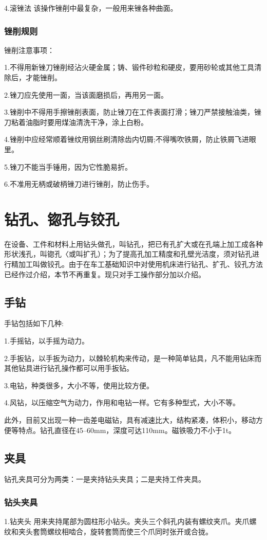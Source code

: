 \documentclass{ctexbook}
\begin{document}
4.滚锉法 该操作锉削中最复杂，一般用来锉各种曲面。
\subsubsection{锉削规则}
锉削注意事项：

1.不得用新锉刀锉削经沾火硬金属；铸、锻件砂粒和硬皮，要用砂轮或其他工具清除后，才能锉削。

2.锉刀应先使用一面，当该面磨损后，再用另一面。

3.锉削中不得用手擦锉削表面，防止锉刀在工件表面打滑；锉刀严禁接触油类，锉刀粘着油脂时要用煤油清洗干净，涂上白粉。

4.锉削中应经常顺着锉纹用钢丝刷清除齿内切屑;不得嘴吹铁屑，防止铁屑飞进眼里。

5.锉刀不能当手锤用，因为它性脆易折。

6.不准用无柄或破柄锉刀进行锉削，防止伤手。
\section{钻孔、锪孔与铰孔}
在设备、工件和材料上用钻头做孔，叫钻孔，把已有孔扩大或在孔端上加工成各种形状浅孔，叫锪孔〈或叫扩孔）；为了提高孔加工精度和孔壁光洁度，须对钻孔进行精加工叫做铰孔。由于在车工基础知识中对使用机床进行钻孔、扩孔、铰孔方法已经作过介绍，本节不再重复。现只对手工操作部分加以介绍。
\subsection{手钻}
手钻包括如下几种:

1.手摇钻，以手摇为动力。

2.手扳钻，以手扳为动力，以棘轮机构来传动，是一种简单钻具，凡不能用钻床而其他钻具进行钻孔操作都可以用手扳钻。

3.电钻，种类很多，大小不等，使用比较方便。

4.风钻，以压缩空气为动力，作用和电钻一样。它有多种型式，大小不等。

此外，目前又出现一种一齿差电磁钻，具有减速比大，结构紧凑，体积小，移动方便等特点。钻孔直径在45--60mm，深度可达110mm。磁铁吸力不小于1t。
\subsection{夹具}
钻孔夹具可分为两类：一是夹持钻头夹具；二是夹持工件夹具。
\subsubsection{钻头夹具}
1.钻夹头 用来夹持尾部为圆柱形小钻头。夹头三个斜孔内装有螺纹夹爪。夹爪螺纹和夹头套筒螺纹相啮合，旋转套筒而使三个爪同时张开或合拢。
\end{document}
